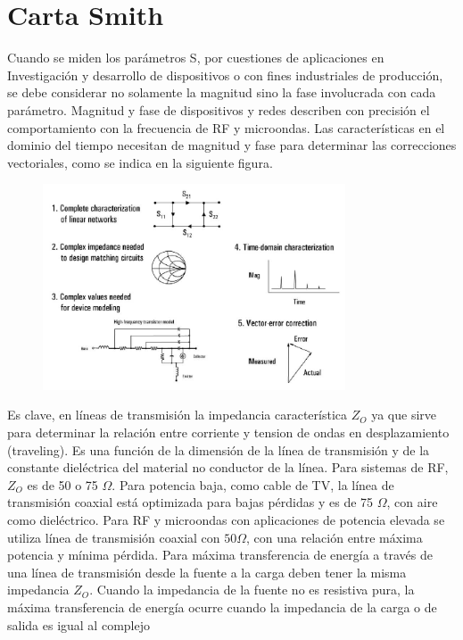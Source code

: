 \documentclass[a4paper,12pt,twoside]{article}
\begin{document}
\section{Carta Smith}
Cuando se miden los parámetros S, por cuestiones de aplicaciones en Investigación y
desarrollo de dispositivos o con fines industriales de producción, se debe considerar no
solamente la magnitud sino la fase involucrada con cada parámetro. Magnitud y fase de
dispositivos y redes describen con precisión el comportamiento con la frecuencia de RF
y microondas.
Las características en el dominio del tiempo necesitan de magnitud y fase para determinar las
correcciones vectoriales, como se indica en la siguiente figura.
\begin{figure}[H]
    \centering
    \includegraphics[width=0.8\textwidth]{../img/smith.png}
\end{figure}
Es clave, en líneas de transmisión la impedancia característica $Z_O$ ya que sirve para determinar
la relación entre corriente y tension de ondas en desplazamiento (traveling). Es una función de
la dimensión de la línea de transmisión y de la constante dieléctrica del material no
conductor de la línea. Para sistemas de RF, $Z_O$ es de 50 o 75 $\Omega$. Para potencia baja, como
cable de TV, la línea de transmisión coaxial está optimizada para bajas pérdidas y es de 75 $\Omega$,
con aire como dieléctrico. Para RF y microondas con aplicaciones de potencia elevada se
utiliza línea de transmisión coaxial con $50\Omega$, con una relación entre máxima potencia y
mínima pérdida.
Para máxima transferencia de energía a través de una línea de transmisión desde la fuente a la
carga deben tener la misma impedancia $Z_O$.
Cuando la impedancia de la fuente no es resistiva pura, la máxima transferencia de
energía ocurre cuando la impedancia de la carga o de salida es igual al complejo
\end{document}
